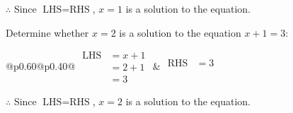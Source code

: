\documentclass[12pt]{article}
\newcounter{minipagecount}
\begin{document}
\begin{multicols}{2}
\begin{minipage}[t]{0.40\textwidth}
    \noindent \(\therefore\) Since \(\text{LHS} = \text{RHS}\), \(x = 1\) is  a solution to the equation.

\end{minipage}

 \vspace*{16pt}
\noindent{(\theminipagecount)}\hspace{0.1mm} %
\begin{minipage}[t]{0.40\textwidth} %

    \noindent Determine whether \(x = 2\) is a solution to the equation \(x + 1 = 3\):
    \vspace{4pt}  %

    \noindent
    \renewcommand{\arraystretch}{1.3} %
    \begin{tabular}{@{}p{0.60\linewidth}@{}p{0.40\linewidth}@{}}
        \(\begin{aligned}
            \text{LHS} &= x + 1 \\
                    &= 2 + 1 \\
                    &= 3 
        \end{aligned}\) &
        \(\begin{aligned}
            \text{RHS} &= 3\\
                    & \\
                    &
        \end{aligned}\)
    \end{tabular}
    \renewcommand{\arraystretch}{1.0} %
    \vspace{2pt}  %

    \noindent \(\therefore\) Since \(\text{LHS} = \text{RHS}\), \(x = 2\) is  a solution to the equation.

\end{minipage}

 \vspace*{16pt}
\columnbreak
\noindent{(\theminipagecount)}\hspace{0.1mm} %
\begin{minipage}[t]{0.40\textwidth} %


\end{minipage}
\end{multicols}
\end{document}
